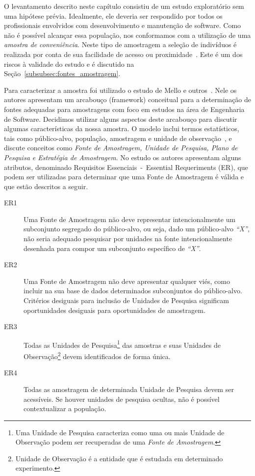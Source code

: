 O levantamento descrito neste capítulo consistiu de um estudo exploratório sem
uma hipótese prévia. Idealmente, ele deveria ser respondido por todos os
profissionais envolvidos com desenvolvimento e manutenção de software. Como não
é possível alcançar essa população, nos conformamos com a utilização de uma
\textit{amostra de conveniência}. Neste tipo de amostragem a seleção de
indivíduos é realizada por conta de sua facilidade de acesso ou
proximidade~\cite{marshall1996sampling}. Este é um dos riscos à validade do
estudo e é discutido na Seção~\ref{subsubsec:fontes_amostragem}.

Para caracterizar a amostra foi utilizado o estudo de Mello e
outros~\cite{de2014towards}. Nele os autores apresentam um arcabouço
(framework) conceitual para a determinação de fontes adequadas para amostragens
com foco em estudos na área de Engenharia de Software. Decidimos utilizar
alguns aspectos deste arcabouço para discutir algumas características da nossa
amostra. O modelo inclui termos estatísticos, tais como público-alvo,
população, amostragem e unidade de observação~\cite{thompson2012sampling}, e
discute conceitos como \textit{Fonte de Amostragem, Unidade de Pesquisa, Plano
    de Pesquisa e Estratégia de Amostragem}. No estudo os autores apresentam
alguns atributos, denominado Requisitos Essenciais~-~Essential Requeriments
(ER), que podem ser utilizadas para determinar que uma Fonte de Amostragem é
válida e que estão descritos a seguir.

\begin{description}

    \item[ER1] Uma Fonte de Amostragem não deve representar intencionalmente um
               subconjunto segregado do público-alvo, ou seja, dado um
               público-alvo \textit{``X''}, não seria adequado pesquisar por
               unidades na fonte intencionalmente desenhada para compor um
               subconjunto específico de \textit{``X''}.

    \item[ER2] Uma Fonte de Amostragem não deve apresentar qualquer viés, como
               incluir na sua base de dados determinados subconjuntos do
               público-alvo.  Critérios desiguais para inclusão de Unidades de
               Pesquisa significam oportunidades desiguais para oportunidades
               de amostragem.

    \item[ER3] Todas as Unidades de Pesquisa\footnote{Uma Unidade de Pesquisa
               caracteriza como uma ou mais Unidade de Observação podem ser
               recuperadas de uma \textit{Fonte de Amostragem}.} das amostras e
               suas Unidades de Observação\footnote{Unidade de Observação é a
               entidade que é estudada em determinado experimento.}
               devem identificados de forma única.

    \item[ER4] Todas as amostragem de determinada Unidade de Pesquisa devem ser
               acessíveis. Se houver unidades de pesquisa ocultas,
               não é possível contextualizar a população.

\end{description}

